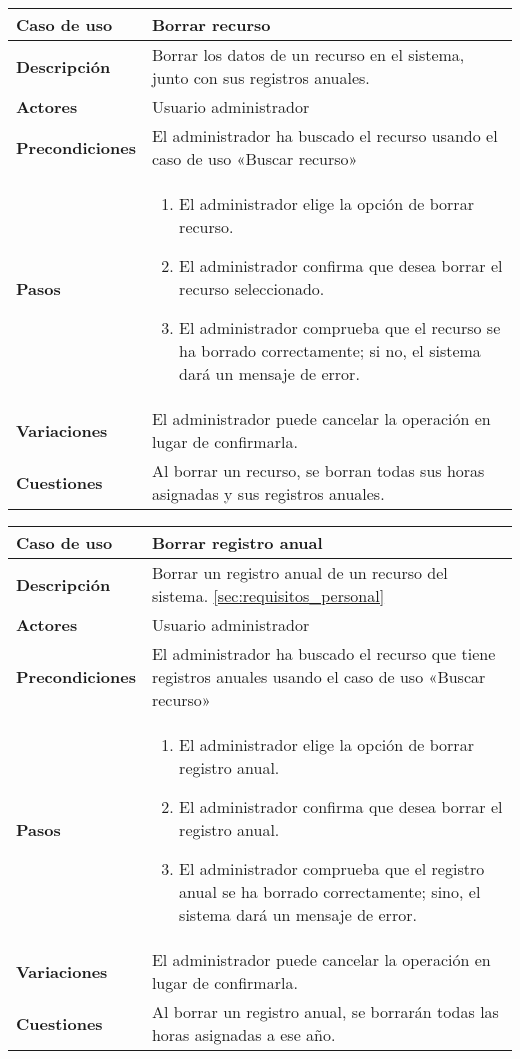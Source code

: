 \begin{tabular}{|p{1.25in}|p{3.65in}|}\hline
\textbf{Caso de uso} & \textbf{Borrar recurso}\\\hline\hline
\textbf{Descripción} & Borrar los datos de un recurso en el sistema, junto con
sus registros anuales. \\\hline
\textbf{Actores} & Usuario administrador\\\hline
\textbf{Precondiciones} & El administrador ha
buscado el recurso usando el caso de uso «Buscar recurso»\\\hline
\textbf{Pasos} &
  \begin{enumerate}
   \item El administrador elige la opción de borrar recurso.
   \item El administrador confirma que desea borrar el recurso seleccionado.
   \item El administrador comprueba que el recurso se ha borrado
correctamente; si no, el sistema dará un mensaje de error.
  \end{enumerate}
\\\hline
\textbf{Variaciones} & El administrador puede cancelar la operación en lugar
de confirmarla.\\\hline
\textbf{Cuestiones} & Al borrar un recurso, se borran todas sus horas asignadas
y sus registros anuales.\\\hline
\end{tabular}

\begin{tabular}{|p{1.25in}|p{3.65in}|}\hline
\textbf{Caso de uso} & \textbf{Borrar registro anual}\\\hline\hline
\textbf{Descripción} & Borrar un registro anual de un recurso
del sistema.
\ref{sec:requisitos_personal}\\\hline
\textbf{Actores} & Usuario administrador\\\hline
\textbf{Precondiciones} & El administrador ha buscado el recurso que tiene
registros anuales usando el caso de uso «Buscar recurso»\\\hline
\textbf{Pasos} &
  \begin{enumerate}
   \item El administrador elige la opción de borrar registro anual.
   \item El administrador confirma que desea borrar el registro anual.
   \item El administrador comprueba que el registro anual se ha borrado
correctamente; sino, el sistema dará un mensaje de error.
  \end{enumerate}
\\\hline
\textbf{Variaciones} & El administrador puede cancelar la operación en lugar
de confirmarla.\\\hline
\textbf{Cuestiones} & Al borrar un registro anual, se borrarán todas las
horas asignadas a ese año.\\\hline
\end{tabular}


